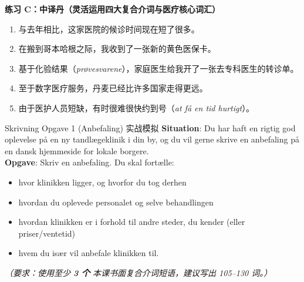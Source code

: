 \textbf{练习 C：中译丹（灵活运用四大复合介词与医疗核心词汇）}
\begin{enumerate}
  \item 与去年相比，这家医院的候诊时间现在短了很多。
  \item 在搬到哥本哈根之际，我收到了一张新的黄色医保卡。
  \item 基于化验结果（\textit{prøvesvarene}），家庭医生给我开了一张去专科医生的转诊单。
  \item 至于数字医疗服务，丹麦已经比许多国家走得更远。
  \item 由于医护人员短缺，有时很难很快约到号（\textit{at få en tid hurtigt}）。
\end{enumerate}


\begin{emailbox}{Skrivning Opgave 1 (Anbefaling) 实战模拟}
\textbf{Situation}: Du har haft en rigtig god oplevelse på en ny tandlægeklinik i din by, og du vil gerne skrive en anbefaling på en dansk hjemmeside for lokale borgere.\\
\textbf{Opgave}: Skriv en anbefaling. Du skal fortælle:
\begin{itemize}
  \item hvor klinikken ligger, og hvorfor du tog derhen
  \item hvordan du oplevede personalet og selve behandlingen
  \item hvordan klinikken er i forhold til andre steder, du kender (eller priser/ventetid)
  \item hvem du især vil anbefale klinikken til.
\end{itemize}
\textit{（要求：使用至少 \textbf{3 个} 本课书面复合介词短语，建议写出 105--130 词。）}
\end{emailbox}

